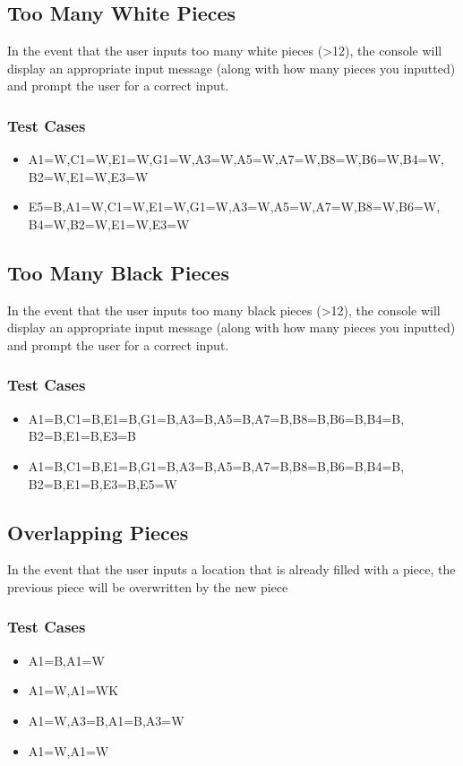 \documentclass{article}
\begin{document}
\subsection{Too Many White Pieces}
In the event that the user inputs too many white pieces (>12), the console will display an appropriate input message (along with how many pieces you inputted) and prompt the user for a correct input.

\subsubsection{Test Cases}
\begin{itemize}
\item A1=W,C1=W,E1=W,G1=W,A3=W,A5=W,A7=W,B8=W,B6=W,B4=W,
B2=W,E1=W,E3=W
\item E5=B,A1=W,C1=W,E1=W,G1=W,A3=W,A5=W,A7=W,B8=W,B6=W,
B4=W,B2=W,E1=W,E3=W
\end{itemize}

\subsection{Too Many Black Pieces}
In the event that the user inputs too many black pieces (>12), the console will display an appropriate input message (along with how many pieces you inputted) and prompt the user for a correct input.

\subsubsection{Test Cases}
\begin{itemize}
\item A1=B,C1=B,E1=B,G1=B,A3=B,A5=B,A7=B,B8=B,B6=B,B4=B, \\
B2=B,E1=B,E3=B
\item A1=B,C1=B,E1=B,G1=B,A3=B,A5=B,A7=B,B8=B,B6=B,B4=B, \\
B2=B,E1=B,E3=B,E5=W
\end{itemize}

\subsection{Overlapping Pieces}
In the event that the user inputs a location that is already filled with a piece, the previous piece will be overwritten by the new piece
\subsubsection{Test Cases}
\begin{itemize}
\item A1=B,A1=W
\item A1=W,A1=WK
\item A1=W,A3=B,A1=B,A3=W
\item A1=W,A1=W
\end{itemize}
\end{document}
